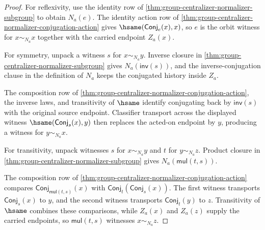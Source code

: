 \begin{proof}
For reflexivity, use the identity row of
\autoref{thm:group-centralizer-normalizer-subgroup} to obtain $N_a(e)$. The
identity action row of
\autoref{thm:group-centralizer-normalizer-conjugation-action} gives
$\hsame(\mathsf{Conj}_e(x),x)$, so $e$ is the orbit witness for
$x\sim_{N_a}x$ together with the carried endpoint $Z_a(x)$.

For symmetry, unpack a witness $s$ for $x\sim_{N_a}y$. Inverse closure in
\autoref{thm:group-centralizer-normalizer-subgroup} gives
$N_a(\mathsf{inv}(s))$, and the inverse-conjugation clause in the definition
of $N_a$ keeps the conjugated history inside $Z_a$.

The composition row of
\autoref{thm:group-centralizer-normalizer-conjugation-action}, the inverse
laws, and transitivity of $\hsame$ identify conjugating back by
$\mathsf{inv}(s)$ with the original source endpoint. Classifier transport
across the displayed witness $\hsame(\mathsf{Conj}_s(x),y)$ then replaces the
acted-on endpoint by $y$, producing a witness for $y\sim_{N_a}x$.

For transitivity, unpack witnesses $s$ for $x\sim_{N_a}y$ and $t$ for
$y\sim_{N_a}z$. Product closure in
\autoref{thm:group-centralizer-normalizer-subgroup} gives
$N_a(\mathsf{mul}(t,s))$.

The composition row of
\autoref{thm:group-centralizer-normalizer-conjugation-action} compares
$\mathsf{Conj}_{\mathsf{mul}(t,s)}(x)$ with
$\mathsf{Conj}_t(\mathsf{Conj}_s(x))$. The first witness transports
$\mathsf{Conj}_s(x)$ to $y$, and the second witness transports
$\mathsf{Conj}_t(y)$ to $z$. Transitivity of $\hsame$ combines these
comparisons, while $Z_a(x)$ and $Z_a(z)$ supply the carried endpoints, so
$\mathsf{mul}(t,s)$ witnesses $x\sim_{N_a}z$.
\end{proof}

